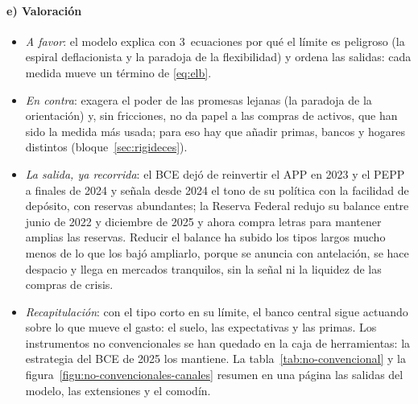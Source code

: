 \documentclass[11pt]{article}
\begin{document}
\paragraph{e) Valoración}\label{sec:salida}
\begin{itemize}
\item \emph{A favor}: el modelo explica con 3~ecuaciones por qué el límite es peligroso (la espiral deflacionista y la paradoja de la flexibilidad) y ordena las salidas: cada medida mueve un término de \eqref{eq:elb}.
\item \emph{En contra}: exagera el poder de las promesas lejanas (la paradoja de la orientación) y, sin fricciones, no da papel a las compras de activos, que han sido la medida más usada; para eso hay que añadir primas, bancos y hogares distintos (bloque~\ref{sec:rigideces}).
\item \emph{La salida, ya recorrida}: el BCE dejó de reinvertir el APP en 2023 y el PEPP a finales de 2024\nocite{BieberLizarazo2026Liquidez} y señala desde 2024 el tono de su política con la facilidad de depósito, con reservas abundantes\nocite{BCE2024Marco}; la Reserva Federal redujo su balance entre junio de 2022 y diciembre de 2025\nocite{Fed2022Reduccion,Fed2025FOMCoct} y ahora compra letras para mantener amplias las reservas\nocite{Fed2025FOMCdic}. Reducir el balance ha subido los tipos largos mucho menos de lo que los bajó ampliarlo, porque se anuncia con antelación, se hace despacio y llega en mercados tranquilos, sin la señal ni la liquidez de las compras de crisis\nocite{DuForbesLuzzetti2024Quantitative}.
\item \emph{Recapitulación}: con el tipo corto en su límite, el banco central sigue actuando sobre lo que mueve el gasto: el suelo, las expectativas y las primas. Los instrumentos no convencionales se han quedado en la caja de herramientas: la estrategia del BCE de 2025 los mantiene\nocite{BCE2025Estrategia}. La tabla~\ref{tab:no-convencional} y la figura~\ref{figu:no-convencionales-canales} resumen en una página las salidas del modelo, las extensiones y el comodín.
\end{itemize}
\end{document}
